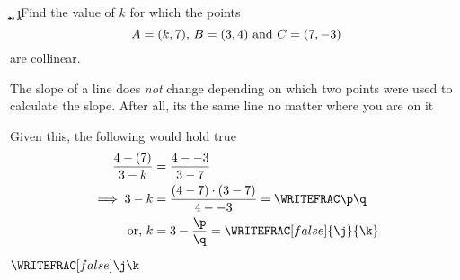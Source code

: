 


\SUBTRACT\vc\va\a
\SUBTRACT\vb\vd\b
\SUBTRACT\vc\ve\c
\MULTIPLY\a\b\m
\FRACTIONSIMPLIFY\m\c\p\q
\FRACMINUS{}\p\q\j\k

\question[2]  Find the value of $k$ for which the points 
\[ A=(k, 7),\, B=(3, 4)\text{ and }C=(7, -3)\] 
are collinear.

\watchout

\begin{solution}[\mcq]
	The slope of a line does \emph{not} change depending on which two points were
	used to calculate the slope. After all, its the same line no matter where you 
	are on it 
	
	
	Given this, the following would hold true
	\begin{align}
	  \dfrac{\vc - (\va)}{\vb - k} &= 
	  \dfrac{\vc - \ve}{\vb - \vd}\\
	  \implies \vb - k &= \dfrac{(\vc - \va)\cdot(\vb - \vd)}{\vc - \ve} = \WRITEFRAC\p\q \\
	  \text{ or, } k &= \vb - \dfrac{\p}{\q} = \WRITEFRAC[false]{\j}{\k}
	\end{align}
\end{solution}

\ifprintanswers\begin{codex}$\WRITEFRAC[false]\j\k$\end{codex}\fi
